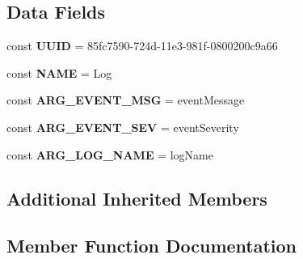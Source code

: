 \subsection*{Data Fields}
\begin{DoxyCompactItemize}
\item 
\hypertarget{class_able_polecat___command___log_a74b892c8c0b86bf9d04c5819898c51e7}{}const {\bfseries U\+U\+I\+D} = \textquotesingle{}85fc7590-\/724d-\/11e3-\/981f-\/0800200c9a66\textquotesingle{}\label{class_able_polecat___command___log_a74b892c8c0b86bf9d04c5819898c51e7}

\item 
\hypertarget{class_able_polecat___command___log_a244352f035b82b20b0efa506167fd862}{}const {\bfseries N\+A\+M\+E} = \textquotesingle{}Log\textquotesingle{}\label{class_able_polecat___command___log_a244352f035b82b20b0efa506167fd862}

\item 
\hypertarget{class_able_polecat___command___log_a4efa6e839b9592a73c279b4240f39d04}{}const {\bfseries A\+R\+G\+\_\+\+E\+V\+E\+N\+T\+\_\+\+M\+S\+G} = \textquotesingle{}event\+Message\textquotesingle{}\label{class_able_polecat___command___log_a4efa6e839b9592a73c279b4240f39d04}

\item 
\hypertarget{class_able_polecat___command___log_ac8cc11987468f72d6ce51ab0964b2774}{}const {\bfseries A\+R\+G\+\_\+\+E\+V\+E\+N\+T\+\_\+\+S\+E\+V} = \textquotesingle{}event\+Severity\textquotesingle{}\label{class_able_polecat___command___log_ac8cc11987468f72d6ce51ab0964b2774}

\item 
\hypertarget{class_able_polecat___command___log_a255a76c7dc265c70474dc591ad864133}{}const {\bfseries A\+R\+G\+\_\+\+L\+O\+G\+\_\+\+N\+A\+M\+E} = \textquotesingle{}log\+Name\textquotesingle{}\label{class_able_polecat___command___log_a255a76c7dc265c70474dc591ad864133}

\end{DoxyCompactItemize}
\subsection*{Additional Inherited Members}


\subsection{Member Function Documentation}
\hypertarget{class_able_polecat___command___log_ac037ec24ef8efefd73088bf2c64730a2}{}
